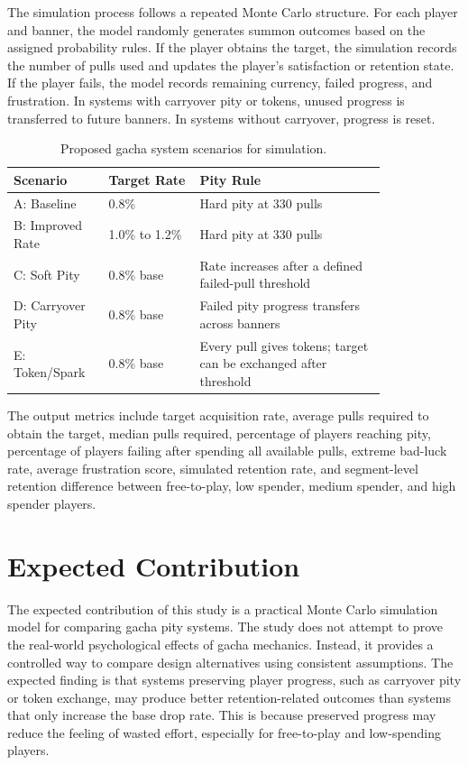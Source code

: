 \documentclass[sigconf,nonacm]{acmart}
\begin{document}
The simulation process follows a repeated Monte Carlo structure. For each player and banner, the model randomly generates summon outcomes based on the assigned probability rules. If the player obtains the target, the simulation records the number of pulls used and updates the player's satisfaction or retention state. If the player fails, the model records remaining currency, failed progress, and frustration. In systems with carryover pity or tokens, unused progress is transferred to future banners. In systems without carryover, progress is reset.

\begin{table}[h]
\centering
\caption{Proposed gacha system scenarios for simulation.}
\label{tab:scenarios}
\begin{tabular}{p{0.18\linewidth}p{0.21\linewidth}p{0.43\linewidth}}
\toprule
\textbf{Scenario} & \textbf{Target Rate} & \textbf{Pity Rule} \\
\midrule
A: Baseline & 0.8\% & Hard pity at 330 pulls \\
B: Improved Rate & 1.0\% to 1.2\% & Hard pity at 330 pulls \\
C: Soft Pity & 0.8\% base & Rate increases after a defined failed-pull threshold \\
D: Carryover Pity & 0.8\% base & Failed pity progress transfers across banners \\
E: Token/Spark & 0.8\% base & Every pull gives tokens; target can be exchanged after threshold \\
\bottomrule
\end{tabular}
\end{table}

The output metrics include target acquisition rate, average pulls required to obtain the target, median pulls required, percentage of players reaching pity, percentage of players failing after spending all available pulls, extreme bad-luck rate, average frustration score, simulated retention rate, and segment-level retention difference between free-to-play, low spender, medium spender, and high spender players.

\section{Expected Contribution}

The expected contribution of this study is a practical Monte Carlo simulation model for comparing gacha pity systems. The study does not attempt to prove the real-world psychological effects of gacha mechanics. Instead, it provides a controlled way to compare design alternatives using consistent assumptions. The expected finding is that systems preserving player progress, such as carryover pity or token exchange, may produce better retention-related outcomes than systems that only increase the base drop rate. This is because preserved progress may reduce the feeling of wasted effort, especially for free-to-play and low-spending players.
\end{document}
